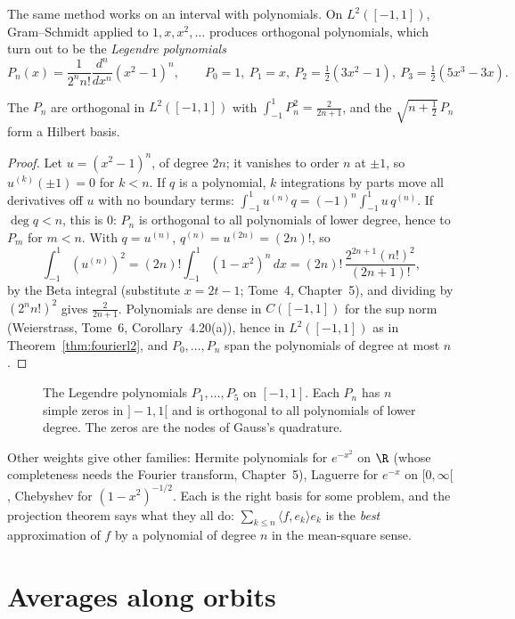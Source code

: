 The same method works on an interval with polynomials. On $L^2([-1,1])$, Gram--Schmidt applied to $1,x,x^2,\dots$ produces orthogonal polynomials, which turn out to be the \emph{Legendre polynomials}
\[P_n(x)=\frac1{2^nn!}\frac{d^n}{dx^n}(x^2-1)^n,\qquad P_0=1,\ P_1=x,\ P_2=\tfrac12(3x^2-1),\ P_3=\tfrac12(5x^3-3x).\]

\begin{proposition}\label{prop:legendre}
The $P_n$ are orthogonal in $L^2([-1,1])$ with $\int_{-1}^1P_n^2=\frac2{2n+1}$, and the $\sqrt{n+\frac12}\,P_n$ form a Hilbert basis.
\end{proposition}
\begin{proof}
Let $u=(x^2-1)^n$, of degree $2n$; it vanishes to order $n$ at $\pm1$, so $u^{(k)}(\pm1)=0$ for $k<n$. If $q$ is a polynomial, $k$ integrations by parts move all derivatives off $u$ with no boundary terms:
$\int_{-1}^1u^{(n)}q=(-1)^n\int_{-1}^1u\,q^{(n)}$. If $\deg q<n$, this is $0$: $P_n$ is orthogonal to all polynomials of lower degree, hence to $P_m$ for $m<n$. With $q=u^{(n)}$, $q^{(n)}=u^{(2n)}=(2n)!$, so
\[\int_{-1}^1(u^{(n)})^2=(2n)!\int_{-1}^1(1-x^2)^n\,dx=(2n)!\,\frac{2^{2n+1}(n!)^2}{(2n+1)!},\]
by the Beta integral (substitute $x=2t-1$; Tome~4, Chapter~5), and dividing by $(2^nn!)^2$ gives $\frac2{2n+1}$. Polynomials are dense in $C([-1,1])$ for the sup norm (Weierstrass, Tome~6, Corollary~4.20(a)), hence in
$L^2([-1,1])$ as in Theorem~\ref{thm:fourierl2}, and $P_0,\dots,P_n$ span the polynomials of degree at most $n$.
\end{proof}

\begin{figure}[ht]
\centering
{}
\caption{The Legendre polynomials $P_1,\dots,P_5$ on $[-1,1]$. Each $P_n$ has $n$ simple zeros in $]-1,1[$ and is orthogonal to all polynomials of lower degree. The zeros are the nodes of Gauss's quadrature.}
\label{fig:legendre}
\end{figure}

Other weights give other families: Hermite polynomials for $e^{-x^2}$ on $\R$ (whose completeness needs the Fourier transform, Chapter~5), Laguerre for $e^{-x}$ on $[0,\infty[$, Chebyshev for $(1-x^2)^{-1/2}$. Each is
the right basis for some problem, and the projection theorem says what they all do: $\sum_{k\le n}\langle f,e_k\rangle e_k$ is the \emph{best} approximation of $f$ by a polynomial of degree $n$ in the mean-square sense.

\section{Averages along orbits}

